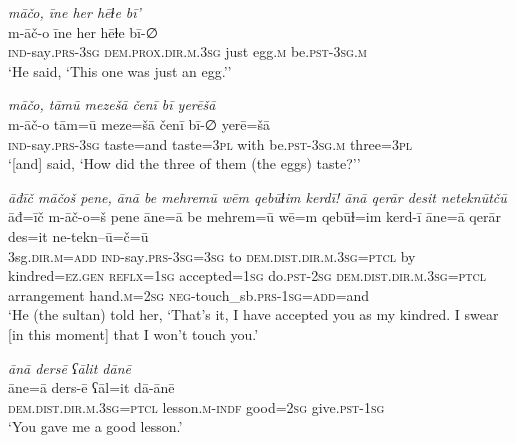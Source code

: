 \ea \label{ŽH.95}
\textit{māčo, īne her hēɫe bī’} \\ 
\gll m-āč-o īne her hēɫe bī-∅ \\ 
 \textsc{ind-}say\textsc{.prs}\textsc{-3sg} \textsc{dem.prox}\textsc{.dir}\textsc{.m}\textsc{.3sg} just egg\textsc{.m} be\textsc{.pst}\textsc{-3sg}\textsc{.m} \\ 
\glt `He said, ‘This one was just an egg.’'
\z 
 
\ea \label{ŽH.97}
\textit{māčo, tāmū mezešā čenī bī yerēšā} \\ 
\gll m-āč-o tām=ū meze=šā čenī bī-∅ yerē=šā \\ 
 \textsc{ind-}say\textsc{.prs}\textsc{-3sg} taste=and taste\textsc{=3pl} with be\textsc{.pst}\textsc{-3sg}\textsc{.m} three\textsc{=3pl} \\ 
\glt `[and] said, ‘How did the three of them (the eggs) taste?’'
\z 
 
\ea \label{ŽH.103}
\textit{āđīč māčoš pene, ānā be mehremū wēm qebūɫim kerdī! ānā qerār desit neteknūtčū} \\ 
\gll āđ=īč m-āč-o=š pene āne=ā be mehrem=ū wē=m qebūɫ=im kerd-ī āne=ā qerār des=it ne-tekn--ū=č=ū \\ 
 3sg\textsc{.dir}\textsc{.m}\textsc{=add} \textsc{ind-}say\textsc{.prs}\textsc{-3sg}\textsc{=3sg} to \textsc{dem.dist}\textsc{.dir}\textsc{.m}\textsc{.3sg}=\textsc{ptcl} by kindred\textsc{=ez}\textsc{.gen} \textsc{reflx}\textsc{=1sg} accepted\textsc{=1sg} do\textsc{.pst}-\textsc{2sg} \textsc{dem.dist}\textsc{.dir}\textsc{.m}\textsc{.3sg}=\textsc{ptcl} arrangement hand\textsc{.m}\textsc{=\textsc{2sg}} \textsc{neg-}touch\_sb\textsc{.prs}\textsc{-1sg}\textsc{=add}=and \\ 
\glt `He (the sultan) told her, ‘That’s it, I have accepted you as my kindred. I swear [in this moment] that I won’t touch you.'
\z 
 
\ea \label{ŽH.104}
\textit{ānā dersē ʕālit dānē} \\ 
\gll āne=ā ders-ē ʕāl=it dā-ānē \\ 
 \textsc{dem.dist}\textsc{.dir}\textsc{.m}\textsc{.3sg}=\textsc{ptcl} lesson\textsc{.m}\textsc{-indf} good\textsc{=\textsc{2sg}} give\textsc{.pst}\textsc{-1sg} \\ 
\glt `You gave me a good lesson.'
\z 
 
